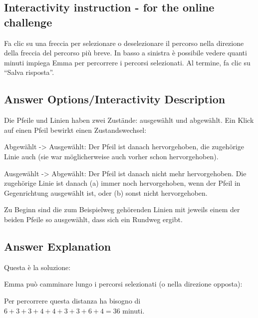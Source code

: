 \documentclass[a4paper,11pt]{report}
\newcommand{\taskGraphicsFolder}{..}
\begin{document}
\subsection*{Interactivity instruction - for the online challenge}

Fa clic su una freccia per selezionare o deselezionare il percorso nella direzione della freccia del percorso più breve.
In basso a sinistra è possibile vedere quanti minuti impiega Emma per percorrere i percorsi selezionati.
Al termine, fa clic su \enquote{Salva risposta}.

\begingroup
\renewcommand{\arraystretch}{1.5}
\subsection*{Answer Options/Interactivity Description}

Die Pfeile und Linien haben zwei Zustände: ausgewählt und abgewählt.
Ein Klick auf einen Pfeil bewirkt einen Zustandswechsel:

Abgewählt -> Ausgewählt:
Der Pfeil ist danach hervorgehoben, die zugehörige Linie auch (sie war möglicherweise auch vorher schon hervorgehoben).

Ausgewählt -> Abgewählt:
Der Pfeil ist danach nicht mehr hervorgehoben.  Die zugehörige Linie ist danach (a) immer noch hervorgehoben, wenn der Pfeil in Gegenrichtung ausgewählt ist, oder (b) sonst nicht hervorgehoben.

Zu Beginn sind die zum Beispielweg gehörenden Linien mit jeweils einem der beiden Pfeile so ausgewählt, dass sich ein Rundweg ergibt.

\endgroup

\subsection*{Answer Explanation}

Questa è la soluzione:

{\centering%
\par}

Emma può camminare lungo i percorsi selezionati (o nella direzione opposta):

{\centering%
\par}

Per percorrere questa distanza ha bisogno di ${6 + 3 + 3 + 4 + 4 + 3 + 3 + 6 + 4 = 36}$ minuti.
\end{document}
